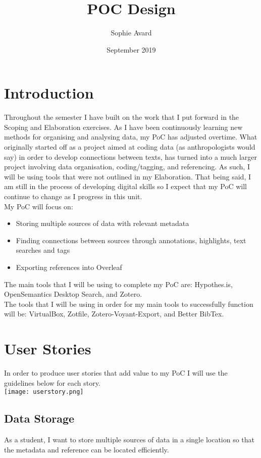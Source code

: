 \documentclass{article}
\title{POC Design}
\author{Sophie Avard}
\date{September 2019}
\begin{document}
\maketitle

\tableofcontents

\section{Introduction}
Throughout the semester I have built on the work that I put forward in the Scoping and Elaboration exercises. As I have been continuously learning new methods for organising and analysing data, my PoC has adjusted overtime. What originally started off as a project aimed at coding data (as anthropologists would say) in order to develop connections between texts, has turned into a much larger project involving data organisation, coding/tagging, and referencing. As such, I will be using tools that were not outlined in my Elaboration. That being said, I am still in the process of developing digital skills so I expect that my PoC will continue to change as I progress in this unit.\\
My PoC will focus on:
\begin{itemize}
    \item Storing multiple sources of data with relevant metadata
    \item Finding connections between sources through annotations, highlights, text searches and tags
    \item Exporting references into Overleaf 
\end{itemize}
The main tools that I will be using to complete my PoC are: Hypothes.is, OpenSemantics Desktop Search, and Zotero.\\ The tools that I will be using in order for my main tools to successfully function will be: VirtualBox, Zotfile, Zotero-Voyant-Export, and Better BibTex.

\section{User Stories}
In order to produce user stories that add value to my PoC I will use the guidelines below for each story.\\
\texttt{[image: userstory.png]}

\subsection{Data Storage}
As a student, I want to store multiple sources of data in a single location so that the metadata and reference can be located efficiently.
\end{document}
